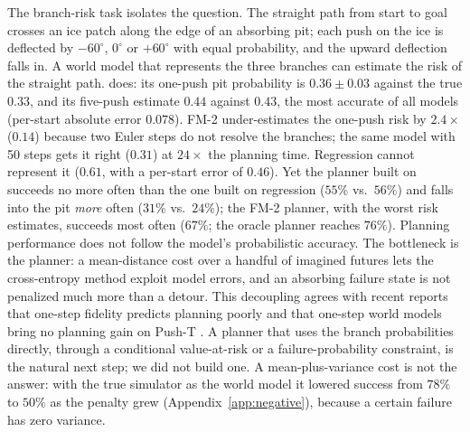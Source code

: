The branch-risk task isolates the question. The straight path from start to goal crosses an ice patch along the edge of an absorbing pit; each push on the ice is deflected by $-60^\circ$, $0^\circ$ or $+60^\circ$ with equal probability, and the upward deflection falls in. A world model that represents the three branches can estimate the risk of the straight path. \imlewm{} does: its one-push pit probability is $0.36 \pm 0.03$ against the true $0.33$, and its five-push estimate $0.44$ against $0.43$, the most accurate of all models (per-start absolute error $0.078$). FM-2 under-estimates the one-push risk by $2.4\times$ ($0.14$) because two Euler steps do not resolve the branches; the same model with 50 steps gets it right ($0.31$) at $24\times$ the planning time. Regression cannot represent it ($0.61$, with a per-start error of $0.46$). Yet the planner built on \imlewm{} succeeds no more often than the one built on regression ($55\%$ vs.\ $56\%$) and falls into the pit \emph{more} often ($31\%$ vs.\ $24\%$); the FM-2 planner, with the worst risk estimates, succeeds most often ($67\%$; the oracle planner reaches $76\%$). Planning performance does not follow the model's probabilistic accuracy. The bottleneck is the planner: a mean-distance cost over a handful of imagined futures lets the cross-entropy method exploit model errors, and an absorbing failure state is not penalized much more than a detour. This decoupling agrees with recent reports that one-step fidelity predicts planning poorly \citep{cheung2026fidelity,terver2025drives} and that one-step world models bring no planning gain on Push-T \citep{lee2026beckmann}. A planner that uses the branch probabilities directly, through a conditional value-at-risk or a failure-probability constraint, is the natural next step; we did not build one. A mean-plus-variance cost is not the answer: with the true simulator as the world model it lowered success from $78\%$ to $50\%$ as the penalty grew (Appendix~\ref{app:negative}), because a certain failure has zero variance.
